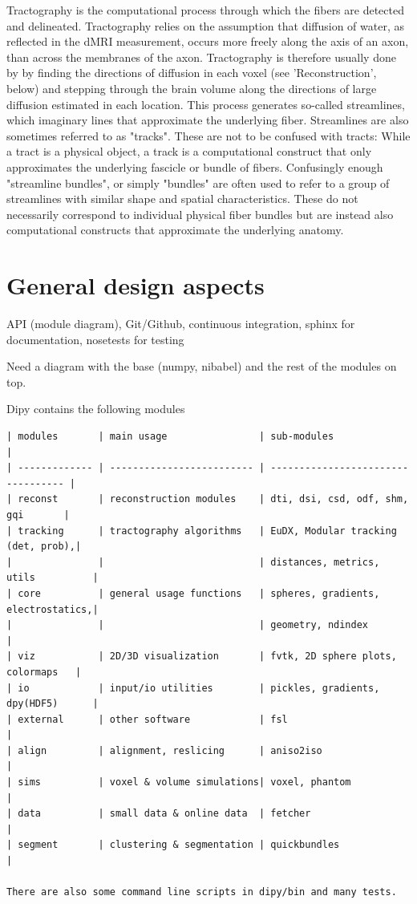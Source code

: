 \documentclass{bioinfo}
\begin{document}
Tractography is the computational process through which the fibers are detected and delineated. Tractography relies on the assumption that diffusion of water, as reflected in the dMRI measurement, occurs more freely along the axis of an axon, than across the membranes of the axon. Tractography is therefore usually done by by finding the directions of diffusion in each voxel (see 'Reconstruction', below) and stepping through the brain volume along the directions of large diffusion estimated in each location. This process generates so-called streamlines, which imaginary lines that approximate the underlying fiber. Streamlines are also sometimes referred to as "tracks". These are not to be confused with tracts: While a tract is a physical object, a track is a computational construct that only approximates the underlying fascicle or bundle of fibers. Confusingly enough "streamline bundles", or simply "bundles" are often used to refer to a group of streamlines with similar shape and spatial characteristics. These do not necessarily correspond to individual physical fiber bundles but are instead also computational constructs that approximate the underlying anatomy.


\section{General design aspects}

API (module diagram), Git/Github, continuous integration, sphinx for documentation, nosetests for testing

Need a diagram with the base (numpy, nibabel) and the rest of the modules on top.

Dipy contains the following modules

\tiny
\begin{verbatim}
| modules       | main usage                | sub-modules                        |
| ------------- | ------------------------- | ---------------------------------- |
| reconst       | reconstruction modules    | dti, dsi, csd, odf, shm, gqi       |
| tracking      | tractography algorithms   | EuDX, Modular tracking (det, prob),|
|               |                           | distances, metrics, utils          |
| core          | general usage functions   | spheres, gradients, electrostatics,|
|               |                           | geometry, ndindex                  |
| viz           | 2D/3D visualization       | fvtk, 2D sphere plots, colormaps   |
| io            | input/io utilities        | pickles, gradients, dpy(HDF5)      |
| external      | other software            | fsl                                |
| align         | alignment, reslicing      | aniso2iso                          |
| sims          | voxel & volume simulations| voxel, phantom                     |
| data          | small data & online data  | fetcher                            |
| segment       | clustering & segmentation | quickbundles                       |

There are also some command line scripts in dipy/bin and many tests.
\end{verbatim}
\normalsize
\end{document}
